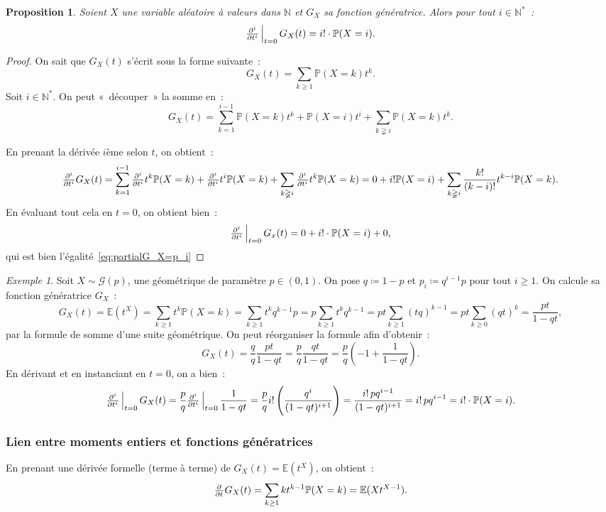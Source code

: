 \documentclass{article}
\newcommand{\E}{\mathbb E}
\newcommand{\N}{\mathbb N}
\renewcommand{\P}{\mathbb P}
\newcommand{\evipd}[3][i]{\pd[#1] {}{#2}\sVert[2]_{#2=#3}}  %
\newtheorem{prp}[thm]{Proposition}
\theoremstyle{definition}
\theoremstyle{remark}
\newtheorem{ex}{Exemple}
\begin{document}
		\begin{prp} Soient $X$ une variable aléatoire à valeurs dans $\N$ et $G_X$ sa fonction génératrice. Alors pour tout $i \in \N^*$~:
		\begin{equation}\label{eq:partialG_X=p_i}
			\evipd t0G_X(t) = i! \cdot \P(X = i).
		\end{equation}
		\end{prp}

		\begin{proof} On sait que $G_X(t)$ s'écrit sous la forme suivante~:
		\[G_X(t) = \sum_{k \geq 1}\P(X = k)t^k.\]
		Soit $i \in \N^*$. On peut «~découper~» la somme en~:
		\[G_X(t) = \sum_{k=1}^{i-1}\P(X = k)t^k + \P(X=i)t^i + \sum_{k \gneqq i}\P(X = k)t^k.\]

		En prenant la dérivée $i$ème selon $t$, on obtient~:
		\[\pd[i] {}tG_X(t) = \sum_{k=1}^{i-1}\pd[i] {}tt^k\P(X=k) + \pd[i] {}tt^i\P(X=k) + \sum_{k \gneqq i}\pd[i] {}tt^k\P(X=k)
		= 0 + i!\P(X=i) + \sum_{k \gneqq i}\frac {k!}{(k-i)!}t^{k-i}\P(X=k).\]
		En évaluant tout cela en $t=0$, on obtient bien~:
		\[\evipd t0G_x(t) = 0 + i! \cdot \P(X = i) + 0,\]
		qui est bien l'égalité~\eqref{eq:partialG_X=p_i}
		\end{proof}

		\begin{ex} Soit $X \sim \mathcal G(p)$, une géométrique de paramètre $p \in (0, 1)$. On pose $q \coloneqq 1-p$ et $p_i \coloneqq q^{i-1}p$ pour tout
		$i \geq 1$. On calcule sa fonction génératrice $G_X$~:
		\[G_X(t) = \E(t^X) = \sum_{k \geq 1}t^k\P(X=k) = \sum_{k \geq 1}t^kq^{k-1}p = p\sum_{k \geq 1}t^kq^{k-1} = pt \sum_{k \geq 1}(tq)^{k-1} = pt \sum_{k \geq 0}(qt)^k
		= \frac {pt}{1-qt},\]
		par la formule de somme d'une suite géométrique.
		On peut réorganiser la formule afin d'obtenir~:
		\[G_X(t) = \frac qq\frac {pt}{1-qt} = \frac pq\frac {qt}{1-qt} = \frac pq\left(-1 + \frac 1{1-qt}\right).\]
		En dérivant et en instanciant en $t=0$, on a bien~:
		\[\evipd t0G_X(t) = \frac pq\evipd t0\frac {1}{1-qt} = \frac pqi!\left(\frac {q^i}{(1-qt)^{i+1}}\right) = \frac {i!\,pq^{i-1}}{(1-qt)^{i+1}} = i!\,pq^{i-1}
		= i! \cdot \P(X = i).\]
		\end{ex}

		\subsubsection{Lien entre moments entiers et fonctions génératrices}
		En prenant une dérivée formelle (terme à terme) de $G_X(t) = \E(t^X)$, on obtient~:
		\[\pd {}tG_X(t) = \sum_{k \geq 1}kt^{k-1}\P(X=k) = \E(Xt^{X-1}).\]
\end{document}
